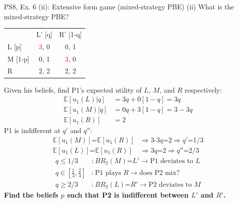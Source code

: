 \begin{frame}{PS8, Ex. 6 (ii): Extensive form game (mixed-strategy PBE)}
    (ii) What is the mixed-strategy PBE? \vspace{-8pt}
    \begin{multicols}{2}
      \begin{table}
        \begin{tabular}{l|c|c|}
          \multicolumn{1}{c}{} & \multicolumn{1}{c}{L' [q]} & \multicolumn{1}{c}{R' [1-q]} \\\cline{2-3}
          L [p]   & \textcolor{red}{3}, 0 & 0, \color{blue}1 \\\cline{2-3}
          M [1-p] & 0, \color{blue}1 & \textcolor{red}{3}, 0 \\\cline{2-3}
          R       & 2, \color{blue}2 & 2, \color{blue}2 \\\cline{2-3}
        \end{tabular}
      \end{table} \vspace{-4pt}
      Given his beliefs, find P1's expected utility of $L$, $M$, and $R$ respectively: \vspace{-4pt}
      \begin{align*}
        \mathbb{E}[u_1(L)|q]&=3q+0[1-q]=3q\\
        \mathbb{E}[u_1(M)|q]&=0q+3[1-q]=3-3q\\
        \mathbb{E}[u_1(R)]&=2
      \end{align*}
      P1 is indifferent at $q'$ and $q''$: \vspace{-6pt}
      \begin{align*}
        \mathbb{E}[u_1(M)]\text{=}\mathbb{E}[u_1(R)]&\Rightarrow \text{3-3}q\text{=}2\Rightarrow q'\text{=}1/3\\
        \mathbb{E}[u_1(L)]\text{=}\mathbb{E}[u_1(R)]&\Rightarrow 3q\text{=}2\Rightarrow q''\text{=}2/3
      \end{align*} \vspace{-16pt}
      \begin{align*}
        q\leq1/3&\text{:}\ BR_2(M)\text{=}L'\rightarrow\text{P1 deviates to }L\\
        q\text{$\in$}{\textstyle\left[\frac{1}{3},\frac{2}{3}\right]}&\text{:}\ \text{P1 plays }R\rightarrow\text{does P2 mix?}\\
        q\geq2/3&\text{:}\ BR_2(L)\text{=}R'\rightarrow\text{P2 deviates to }M
      \end{align*}
      \textbf{Find the beliefs $p$ such that P2 is indifferent between $L'$ and $R'$.}

\end{multicols}
\end{frame}
